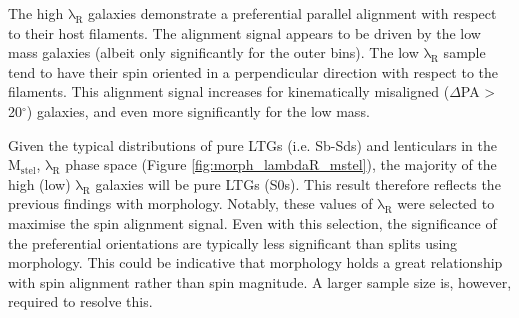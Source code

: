 The high $\mathrm{\lambda_R}$ galaxies demonstrate a preferential parallel alignment with respect to their host filaments. The alignment signal appears to be driven by the low mass galaxies (albeit only significantly for the outer bins). The low $\mathrm{\lambda_R}$ sample tend to have their spin oriented in a perpendicular direction with respect to the filaments. This alignment signal increases for kinematically misaligned ($\Delta$PA > 20$^{\circ}$) galaxies, and even more significantly for the low mass.

Given the typical distributions of pure LTGs (i.e. Sb-Sds) and lenticulars in the $\mathrm{M_{stel}}$, $\mathrm{\lambda_R}$ phase space (Figure \ref{fig:morph_lambdaR_mstel}), the majority of the high (low) $\mathrm{\lambda_R}$ galaxies will be pure LTGs (S0s). This result therefore reflects the previous findings with morphology. Notably, these values of $\mathrm{\lambda_R}$ were selected to maximise the spin alignment signal. Even with this selection, the significance of the preferential orientations are typically less significant than splits using morphology. This could be indicative that morphology holds a great relationship with spin alignment rather than spin magnitude. A larger sample size is, however, required to resolve this.

